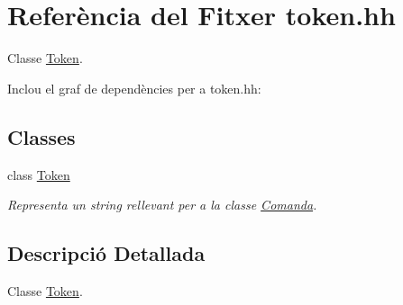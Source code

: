 \hypertarget{token_8hh}{}\section{Referència del Fitxer token.\+hh}
\label{token_8hh}


Classe \hyperlink{class_token}{Token}.  


Inclou el graf de dependències per a token.\+hh\+:
\subsection*{Classes}
\begin{DoxyCompactItemize}
\item 
class \hyperlink{class_token}{Token}
\begin{DoxyCompactList}\small\item\em Representa un string rellevant per a la classe \hyperlink{class_comanda}{Comanda}. \end{DoxyCompactList}\end{DoxyCompactItemize}


\subsection{Descripció Detallada}
Classe \hyperlink{class_token}{Token}. 

